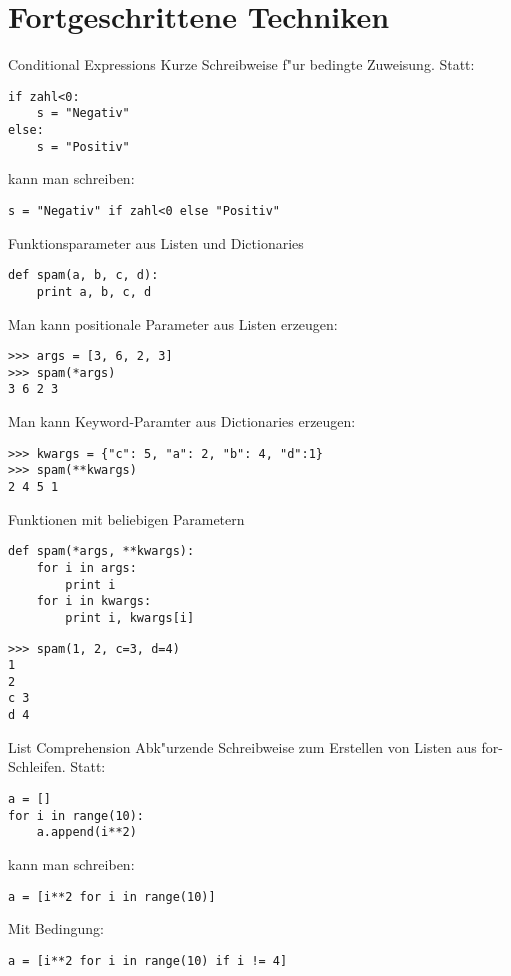 \section{Fortgeschrittene Techniken}

\begin{frame}[fragile]{Conditional Expressions}
Kurze Schreibweise f"ur bedingte Zuweisung. Statt:
\begin{lstlisting}
if zahl<0:
    s = "Negativ"
else:
    s = "Positiv"
\end{lstlisting}
kann man schreiben:
\begin{lstlisting}
s = "Negativ" if zahl<0 else "Positiv"
\end{lstlisting}
\end{frame}

\begin{frame}[fragile]{Funktionsparameter aus Listen und Dictionaries}
\begin{lstlisting}
def spam(a, b, c, d):
    print a, b, c, d
\end{lstlisting}
Man kann positionale Parameter aus Listen erzeugen:
\begin{lstlisting}[style=Shell]
>>> args = [3, 6, 2, 3]
>>> spam(*args)
3 6 2 3
\end{lstlisting}
Man kann Keyword-Paramter aus Dictionaries erzeugen:
\begin{lstlisting}[style=Shell]
>>> kwargs = {"c": 5, "a": 2, "b": 4, "d":1}
>>> spam(**kwargs)
2 4 5 1
\end{lstlisting}
\end{frame}

\begin{frame}[fragile]{Funktionen mit beliebigen Parametern}
\begin{lstlisting}
def spam(*args, **kwargs):
    for i in args:
        print i
    for i in kwargs:
        print i, kwargs[i]
\end{lstlisting}
\begin{lstlisting}[style=Shell]
>>> spam(1, 2, c=3, d=4)
1
2
c 3
d 4
\end{lstlisting}
\end{frame}


\begin{frame}[fragile]{List Comprehension}
Abk"urzende Schreibweise zum Erstellen von Listen aus for-Schleifen. Statt:
\begin{lstlisting}
a = []
for i in range(10):
    a.append(i**2)
\end{lstlisting}
kann man schreiben:
\begin{lstlisting}
a = [i**2 for i in range(10)]
\end{lstlisting}
\vspace{2mm}
Mit Bedingung:
\begin{lstlisting}
a = [i**2 for i in range(10) if i != 4]
\end{lstlisting}
\end{frame}

